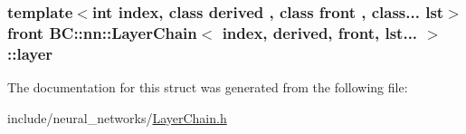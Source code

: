 \subsubsection[{\texorpdfstring{layer}{layer}}]{\setlength{\rightskip}{0pt plus 5cm}template$<$int index, class derived , class front , class... lst$>$ front {\bf B\+C\+::nn\+::\+Layer\+Chain}$<$ index, derived, front, lst... $>$\+::layer}\hypertarget{structBC_1_1nn_1_1LayerChain_3_01index_00_01derived_00_01front_00_01lst_8_8_8_01_4_aa6b12c07d3bd41a770143aa4a4bb2bc5}{}\label{structBC_1_1nn_1_1LayerChain_3_01index_00_01derived_00_01front_00_01lst_8_8_8_01_4_aa6b12c07d3bd41a770143aa4a4bb2bc5}


The documentation for this struct was generated from the following file\+:\begin{DoxyCompactItemize}
\item 
include/neural\+\_\+networks/\hyperlink{LayerChain_8h}{Layer\+Chain.\+h}\end{DoxyCompactItemize}
